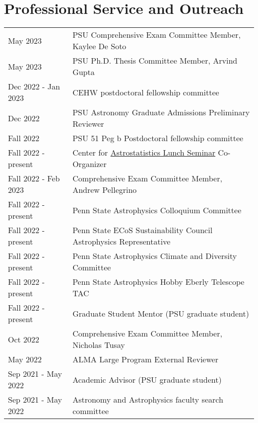 \section*{Professional Service and Outreach}
\begin{tabular*}{\textwidth}{@{\hspace{10pt}}p{1.4in}l}
May 2023 & PSU Comprehensive Exam Committee Member, Kaylee De Soto \\    
May 2023 & PSU Ph.D. Thesis Committee Member, Arvind Gupta\\
Dec 2022 - Jan 2023 & CEHW postdoctoral fellowship committee \\
Dec 2022 & PSU Astronomy Graduate Admissions Preliminary Reviewer \\
Fall 2022 & PSU 51 Peg b Postdoctoral fellowship committee \\
Fall 2022 - present & Center for \href{https://sites.psu.edu/astrostatistics/cast-lunch-meetings/}{Astrostatistics Lunch Seminar} Co-Organizer \\
Fall 2022 - Feb 2023 & Comprehensive Exam Committee Member, Andrew Pellegrino \\    
Fall 2022 - present & Penn State Astrophysics Colloquium Committee \\
Fall 2022 - present & Penn State ECoS Sustainability Council Astrophysics Representative \\
Fall 2022 - present & Penn State Astrophysics Climate and Diversity Committee \\
Fall 2022 - present & Penn State Astrophysics Hobby Eberly Telescope TAC \\
Fall 2022 - present & Graduate Student Mentor (PSU graduate student) \\ %
Oct 2022 & Comprehensive Exam Committee Member, Nicholas Tusay \\
May 2022 & ALMA Large Program External Reviewer \\
Sep 2021 - May 2022 & Academic Advisor (PSU graduate student) \\ %
Sep 2021 - May 2022 & Astronomy and Astrophysics faculty search committee\\

\end{tabular*}
